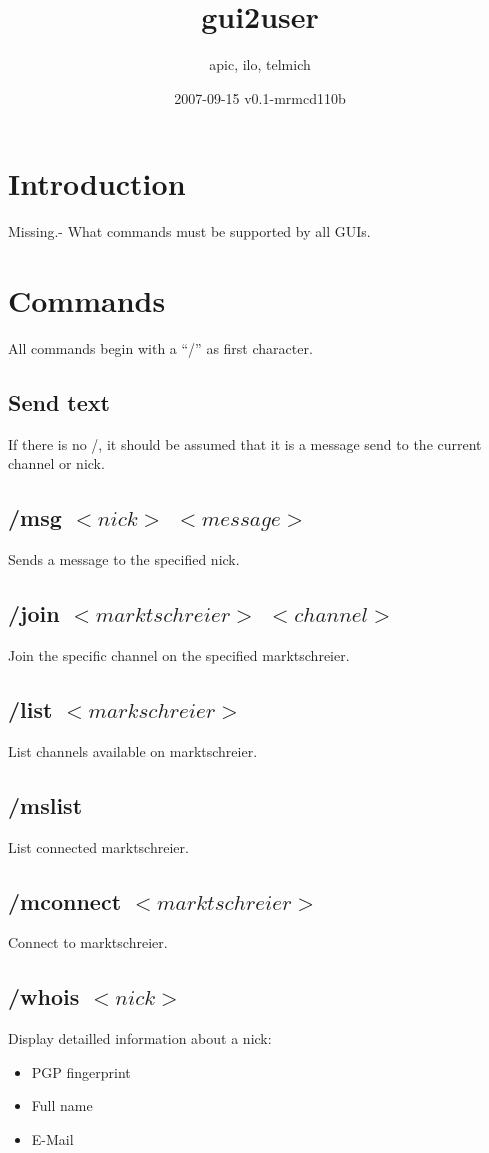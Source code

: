 \documentclass[12pt,a4paper]{article}
\begin{document}
\title{gui2user}
\date{2007-09-15 v0.1-mrmcd110b}
\author{apic, ilo, telmich}

\maketitle

\section{Introduction}
Missing.- What commands must be supported by all GUIs.

\section{Commands}
All commands begin with a "`/"' as first character.

\subsection{Send text}
If there is no /, it should be assumed that it is a message send to the current channel or nick.

\subsection{/msg $<nick>$ $<message>$}
Sends a message to the specified nick.

\subsection{/join $<marktschreier>$ $<channel>$}
Join the specific channel on the specified marktschreier.

\subsection{/list $<markschreier>$}
List channels available on marktschreier.

\subsection{/mslist}
List connected marktschreier.

\subsection{/mconnect $<marktschreier>$}
Connect to marktschreier.

\subsection{/whois $<nick>$}
Display detailled information about a nick:
\begin{itemize}
\item PGP fingerprint
\item Full name
\item E-Mail
\end{itemize}
\end{document}
